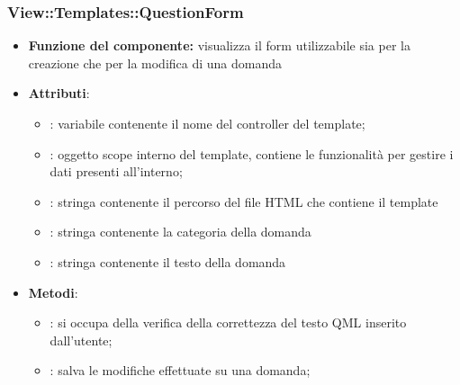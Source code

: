  \subsubsection{View::Templates::QuestionForm}
 \begin{itemize}
 \item\textbf{Funzione del componente:} visualizza il form utilizzabile sia per la creazione che per la modifica di una domanda
 \item\textbf{Attributi}:
 	\begin{itemize}
 		\item{}: variabile contenente il nome del controller del template;\\
		\item{}: oggetto scope interno del template, contiene le funzionalità per gestire i dati presenti all’interno;\\
		\item{}: stringa contenente il percorso del file HTML che contiene il template\\
		\item{}: stringa contenente la categoria della domanda
		\item{}: stringa contenente il testo della domanda
 	\end{itemize}
 	\item\textbf{Metodi}:
 	\begin{itemize}
 		\item{}: si occupa della verifica della correttezza del testo QML inserito dall'utente;\\
 		\item{}: salva le modifiche effettuate su una domanda;\\
 	\end{itemize}
 \end{itemize}
 
